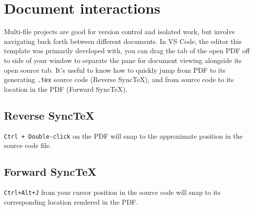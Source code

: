 \documentclass[../../main.tex]{subfiles}  %
\begin{document}
\section{Document interactions}

    Multi-file projects are good for version control and isolated work, but involve navigating back forth between different documents.
    In VS Code, the editor this template was primarily developed with, you can drag the tab of the open PDF off to side of your window to separate the pane for document viewing alongside its open source tab. 
    It's useful to know how to quickly jump from PDF to its generating \verb|.tex| source code (Reverse SyncTeX), and from source code to its location in the PDF (Forward SyncTeX).   

    \subsection{Reverse SyncTeX}

    \verb|Ctrl + Double-click| on the PDF will snap to the approximate position in the source code file.

    \subsection{Forward SyncTeX}

    \verb|Ctrl+Alt+J| from your cursor position in the source code will snap to its corresponding location rendered in the PDF.
    
    
     
\end{document}

